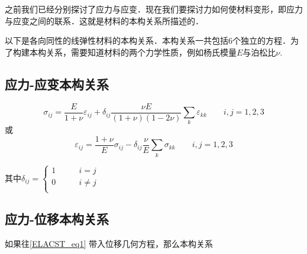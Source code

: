 
\begin{issues}
\issueDraft
\end{issues}

之前我们已经分别探讨了应力与应变．现在我们要探讨力如何使材料变形，即应力与应变之间的联系．这就是材料的本构关系所描述的．

以下是各向同性的线弹性材料的本构关系．本构关系一共包括$6$个独立的方程．为了构建本构关系，需要知道材料的两个力学性质，例如杨氏模量$E$与泊松比$\nu$.

\subsection{应力-应变本构关系}
\begin{equation}\label{ELACST_eq1}
\sigma_{ij}=\frac{E}{1+\nu}\varepsilon_{ij}+\delta_{ij}\frac{\nu E}{(1+\nu)(1-2\nu)}\sum_k\varepsilon_{kk}\qquad i,j=1,2,3
\end{equation}
或
\begin{equation}
\varepsilon_{ij}=\frac{1+\nu}{E}\sigma_{ij}-\delta_{ij}\frac{\nu}{E}\sum_k\sigma_{kk} \qquad i,j=1,2,3
\end{equation}

其中$\delta_{ij} = \left \{
\begin{aligned}
1 &\qquad i = j\\
0 &\qquad i \ne j\\
\end{aligned}
\right.
$

\subsection{应力-位移本构关系}
如果往\autoref{ELACST_eq1} 带入位移几何方程，那么本构关系